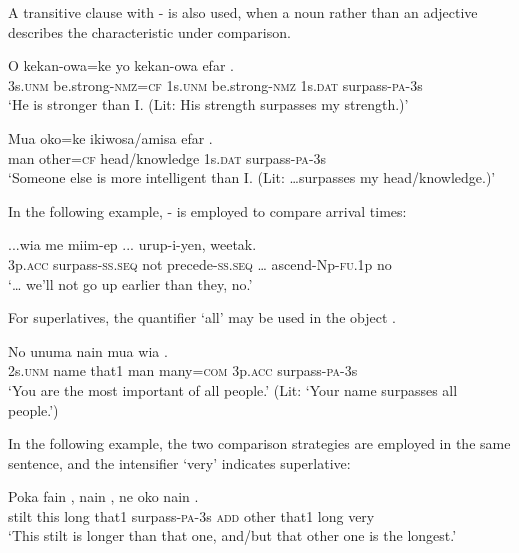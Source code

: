 A transitive clause with - is also used, when a noun rather than an adjective describes the characteristic under comparison. 

\ea%
\label{ex:x1329}
\gll O  kekan-owa=ke  yo  kekan-owa  efar .\\
3s.\textsc{unm}  be.strong-\textsc{nmz}=\textsc{cf}  1s.\textsc{unm}  be.strong-\textsc{nmz}  1s.\textsc{dat} surpass-\textsc{pa}-3s\\
\glt `He is stronger than I. (Lit: His strength surpasses my strength.)'
\z

\ea%
\label{ex:x1894}
\gll Mua  oko=ke  ikiwosa/amisa  efar  . \\
man  other=\textsc{cf}  head/knowledge  1s.\textsc{dat}  surpass-\textsc{pa}-3s\\
\glt `Someone else is more intelligent than I. (Lit: {\dots}surpasses my head/knowledge.)'
\z

In the following example, - is employed to compare arrival times:

\ea%
\label{ex:x1895}
\gll ...wia    me  miim-ep  ... urup-i-yen,  weetak.\\
3p.\textsc{acc}  surpass-\textsc{ss}.\textsc{seq}  not  precede-\textsc{ss}.\textsc{seq}  {\dots} ascend-Np-\textsc{fu}.1p  no\\
\glt `{\dots} we'll not go up earlier than they, no.'
\z

For superlatives, the quantifier  `all' may be used in the object .

\ea%
\label{ex:x1330}
\gll No  unuma  nain  mua    wia  . \\
2s.\textsc{unm}  name  that1  man  many=\textsc{com}  3p.\textsc{acc}  surpass-\textsc{pa}-3s\\
\glt `You are the most important of all people.' (Lit: `Your name surpasses all people.')
\z

In the following example, the two comparison strategies are employed in the same sentence, and the intensifier  `very' indicates superlative:

\ea%
\label{ex:x1337}
\gll Poka  fain  ,  nain  ,  ne  oko  nain   .\\
stilt  this  long  that1  surpass-\textsc{pa}-3s  \textsc{add}  other  that1  long very\\
\glt `This stilt is longer than that one, and/but that other one is the longest.'
\z

